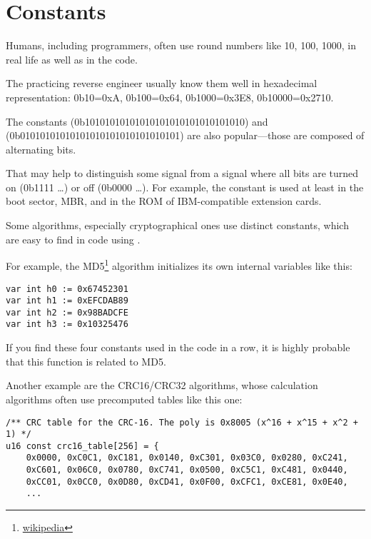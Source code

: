 \section{Constants}

Humans, including programmers, often use round numbers like 10, 100, 1000, 
in real life as well as in the code.

The practicing reverse engineer usually know them well in hexadecimal representation:
0b10=0xA, 0b100=0x64, 0b1000=0x3E8, 0b10000=0x2710.

The constants  (0b10101010101010101010101010101010) and \\
 (0b01010101010101010101010101010101)  are also popular---those
are composed of alternating bits.

That may help to distinguish some signal from a signal where all bits are turned on (0b1111 \dots) or off (0b0000 \dots).
For example, the  constant
is used at least in the boot sector, \ac{MBR}, 
and in the \ac{ROM} of IBM-compatible extension cards.

Some algorithms, especially cryptographical ones use distinct constants, which are easy to find
in code using \IDA.

\newcommand{\URLMD}{http://go.yurichev.com/17111}

For example, the MD5\footnote{\href{\URLMD}{wikipedia}} algorithm initializes its own internal variables like this:

\begin{verbatim}
var int h0 := 0x67452301
var int h1 := 0xEFCDAB89
var int h2 := 0x98BADCFE
var int h3 := 0x10325476
\end{verbatim}

If you find these four constants used in the code in a row, it is highly probable that this function is related to MD5.

\par Another example are the CRC16/CRC32 algorithms, 
whose calculation algorithms often use precomputed tables like this one:

\begin{lstlisting}[caption=linux/lib/crc16.c,style=customc]
/** CRC table for the CRC-16. The poly is 0x8005 (x^16 + x^15 + x^2 + 1) */
u16 const crc16_table[256] = {
	0x0000, 0xC0C1, 0xC181, 0x0140, 0xC301, 0x03C0, 0x0280, 0xC241,
	0xC601, 0x06C0, 0x0780, 0xC741, 0x0500, 0xC5C1, 0xC481, 0x0440,
	0xCC01, 0x0CC0, 0x0D80, 0xCD41, 0x0F00, 0xCFC1, 0xCE81, 0x0E40,
	...
\end{lstlisting}

